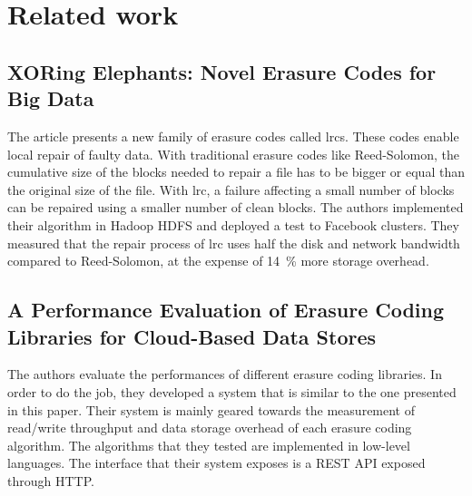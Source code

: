 \chapter{Related work}

\section{XORing Elephants: Novel Erasure Codes for Big Data \autocite{XorbasVLDB}}

The article presents a new family of erasure codes called \acp{lrc}.
These codes enable local repair of faulty data.
With traditional erasure codes like Reed-Solomon, the cumulative size of the blocks needed to repair a file has to be bigger or equal than the original size of the file.
With \ac{lrc}, a failure affecting a small number of blocks can be repaired using a smaller number of clean blocks.
The authors implemented their algorithm in Hadoop HDFS and deployed a test to Facebook clusters.
They measured that the repair process of \ac{lrc} uses half the disk and network bandwidth compared to Reed-Solomon, at the expense of \SI{14}{\percent} more storage overhead.

\section{A Performance Evaluation of Erasure Coding Libraries for Cloud-Based Data Stores \autocite{Burihabwa2016}}

The authors evaluate the performances of different erasure coding libraries.
In order to do the job, they developed a system that is similar to the one presented in this paper.
Their system is mainly geared towards the measurement of read/write throughput and data storage overhead of each erasure coding algorithm.
The algorithms that they tested are implemented in low-level languages.
The interface that their system exposes is a REST API exposed through HTTP.
